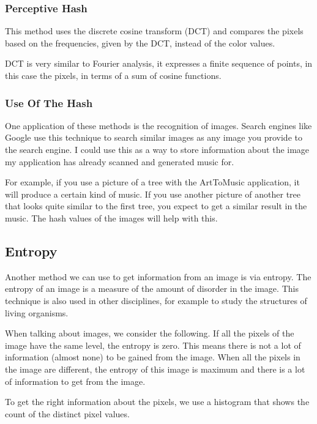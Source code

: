 \documentclass[12pt]{article}
\begin{document}
\subsubsection{Perceptive Hash}
This method uses the discrete cosine transform (DCT) and compares the pixels based on the frequencies, given by the DCT, instead of the color values.

DCT is very similar to Fourier analysis, it expresses a finite sequence of points, in this case the pixels, in terms of a sum of cosine functions.

\subsubsection{Use Of The Hash}
One application of these methods is the recognition of images. Search engines like Google use this technique to search similar images as any image you provide to the search engine. I could use this as a way to store information about the image my application has already scanned and generated music for.
\newline

For example, if you use a picture of a tree with the ArtToMusic application, it will produce a certain kind of music. If you use another picture of another tree that looks quite similar to the first tree, you expect to get a similar result in the music. The hash values of the images will help with this. 

\subsection{Entropy}

Another method we can use to get information from an image is via entropy.
The entropy of an image is a measure of the amount of disorder in the image. This technique is also used in other disciplines, for example to study the structures of living organisms.
\newline

When talking about images, we consider the following. If all the pixels of the image have the same level, the entropy is zero. This means there is not a lot of information (almost none) to be gained from the image. When all the pixels in the image are different, the entropy of this image is maximum and there is a lot of information to get from the image.
\newline

To get the right information about the pixels, we use a histogram that shows the count of the distinct pixel values. 
\newline
\end{document}
